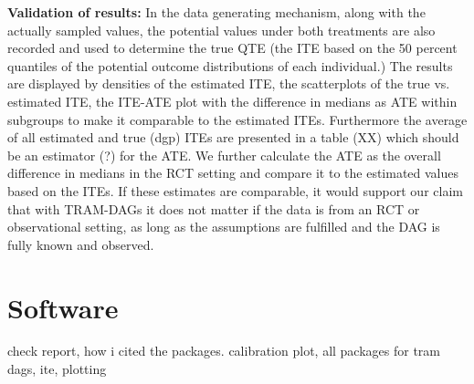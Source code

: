\textbf{Validation of results: } In the data generating mechanism, along with the actually sampled values, the potential values under both treatments are also recorded and used to determine the true QTE (the ITE based on the 50 percent quantiles of the potential outcome distributions of each individual.)
The results are displayed by densities of the estimated ITE, the scatterplots of the true vs. estimated ITE, the ITE-ATE plot with the difference in medians as ATE within subgroups to make it comparable to the estimated ITEs. Furthermore the average of all estimated and true (dgp) ITEs are presented in a table (XX) which should be an estimator (?) for the ATE. We further calculate the ATE as the overall difference in medians in the RCT setting and compare it to the estimated values based on the ITEs. If these estimates are comparable, it would support our claim that with TRAM-DAGs it does not matter if the data is from an RCT or observational setting, as long as the assumptions are fulfilled and the DAG is fully known and observed.



\section{Software}

check report, how i cited the packages. calibration plot, all packages for tram dags, ite, plotting



